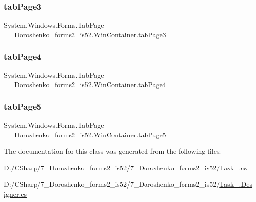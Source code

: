 \subsubsection{\texorpdfstring{tab\+Page3}{tabPage3}}
{\footnotesize\ttfamily System.\+Windows.\+Forms.\+Tab\+Page \+\_\+\_\+\+Doroshenko\+\_\+forms2\+\_\+is52.\+Win\+Container.\+tab\+Page3\hspace{0.3cm}{\ttfamily [private]}}

\hypertarget{class__7___doroshenko__forms2__is52_1_1_win_container_a668bb67ae74294bf8d0c9d693ad407b1}{}\label{class__7___doroshenko__forms2__is52_1_1_win_container_a668bb67ae74294bf8d0c9d693ad407b1} 
\subsubsection{\texorpdfstring{tab\+Page4}{tabPage4}}
{\footnotesize\ttfamily System.\+Windows.\+Forms.\+Tab\+Page \+\_\+\_\+\+Doroshenko\+\_\+forms2\+\_\+is52.\+Win\+Container.\+tab\+Page4\hspace{0.3cm}{\ttfamily [private]}}

\hypertarget{class__7___doroshenko__forms2__is52_1_1_win_container_af352d1f3bdcb743839c129e0fbcb835f}{}\label{class__7___doroshenko__forms2__is52_1_1_win_container_af352d1f3bdcb743839c129e0fbcb835f} 
\subsubsection{\texorpdfstring{tab\+Page5}{tabPage5}}
{\footnotesize\ttfamily System.\+Windows.\+Forms.\+Tab\+Page \+\_\+\_\+\+Doroshenko\+\_\+forms2\+\_\+is52.\+Win\+Container.\+tab\+Page5\hspace{0.3cm}{\ttfamily [private]}}



The documentation for this class was generated from the following files\+:\begin{DoxyCompactItemize}
\item 
D\+:/\+C\+Sharp/7\+\_\+\+Doroshenko\+\_\+forms2\+\_\+is52/7\+\_\+\+Doroshenko\+\_\+forms2\+\_\+is52/\hyperlink{_task__5_8cs}{Task\+\_.\+cs}\item 
D\+:/\+C\+Sharp/7\+\_\+\+Doroshenko\+\_\+forms2\+\_\+is52/7\+\_\+\+Doroshenko\+\_\+forms2\+\_\+is52/\hyperlink{_task__5_8_designer_8cs}{Task\+\_.\+Designer.\+cs}\end{DoxyCompactItemize}
